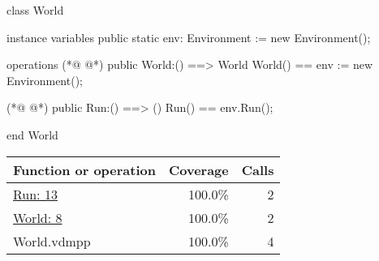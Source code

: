 \begin{vdmpp}
class World

instance variables
  public static env: Environment := new Environment();
  
  
operations
(*@
\label{World:8}
@*)
 public World:() ==> World
 World() ==
  env := new Environment();


(*@
\label{Run:13}
@*)
 public Run:() ==> ()
 Run() ==
  env.Run();


end World
\end{vdmpp}
\bigskip
\begin{longtable}{|l|r|r|}
\hline
Function or operation & Coverage & Calls \\
\hline
\hline
\hyperref[Run:13]{Run: 13} & 100.0\% & 2 \\
\hline
\hyperref[World:8]{World: 8} & 100.0\% & 2 \\
\hline
\hline
World.vdmpp & 100.0\% & 4 \\
\hline
\end{longtable}

